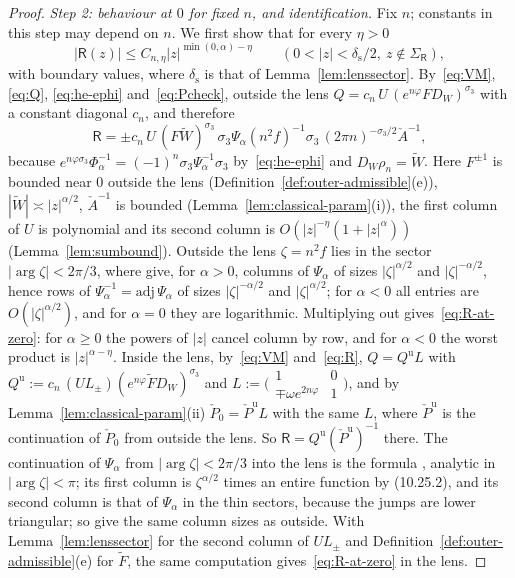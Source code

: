 \begin{proof}
\emph{Step 2: behaviour at $0$ for fixed $n$, and identification.} Fix $n$; constants in this step may depend on $n$.
We first show that for every $\eta>0$
\begin{equation}\label{eq:R-at-zero}
  |\mathsf R(z)|\le C_{n,\eta}|z|^{\min(0,\alpha)-\eta}\qquad(0<|z|<\delta_{\mathrm s}/2,\ z\notin\Sigma_{\mathsf R}),
\end{equation}
with boundary values, where $\delta_{\mathrm s}$ is that of Lemma~\ref{lem:lenssector}. By~\eqref{eq:VM}, \eqref{eq:Q},
\eqref{eq:he-ephi} and~\eqref{eq:Pcheck}, outside the lens
$Q=c_n\,U\,(e^{n\varphi}FD_W)^{\sigma_3}$ with a constant diagonal $c_n$, and therefore
\[
  \mathsf R=\pm c_n\,U\,(F\tilde W)^{\sigma_3}\,\sigma_3\Psi_\alpha(n^2f)^{-1}\sigma_3\,(2\pi n)^{-\sigma_3/2}\check A^{-1},
\]
because $e^{n\varphi\sigma_3}\Phi_\alpha^{-1}=(-1)^n\sigma_3\Psi_\alpha^{-1}\sigma_3$ by~\eqref{eq:he-ephi} and
$D_W\rho_n=\tilde W$. Here $F^{\pm1}$ is bounded near $0$ outside the lens (Definition~\ref{def:outer-admissible}(e)),
$|\tilde W|\asymp|z|^{\alpha/2}$, $\check A^{-1}$ is bounded (Lemma~\ref{lem:classical-param}(i)), the first column of $U$ is
polynomial and its second column is $O(|z|^{-\eta}(1+|z|^\alpha))$ (Lemma~\ref{lem:sumbound}). Outside the lens
$\zeta=n^2f$ lies in the sector $|\arg\zeta|<2\pi/3$, where \cite[(6.19)--(6.21)]{KMVV} give, for $\alpha>0$, columns of
$\Psi_\alpha$ of sizes $|\zeta|^{\alpha/2}$ and $|\zeta|^{-\alpha/2}$, hence rows of $\Psi_\alpha^{-1}=\mathrm{adj}\,\Psi_\alpha$ of
sizes $|\zeta|^{-\alpha/2}$ and $|\zeta|^{\alpha/2}$; for $\alpha<0$ all entries are $O(|\zeta|^{\alpha/2})$, and for $\alpha=0$
they are logarithmic. Multiplying out gives~\eqref{eq:R-at-zero}: for $\alpha\ge0$ the powers of $|z|$ cancel column by
row, and for $\alpha<0$ the worst product is $|z|^{\alpha-\eta}$. Inside the lens, by~\eqref{eq:VM} and~\eqref{eq:R},
$Q=Q^{\mathrm u}L$ with $Q^{\mathrm u}:=c_n\,(UL_\pm)(e^{n\varphi}\tilde FD_W)^{\sigma_3}$ and
$L:=\bigl(\begin{smallmatrix}1&0\\\mp\omega e^{2n\varphi}&1\end{smallmatrix}\bigr)$, and by
Lemma~\ref{lem:classical-param}(ii) $\check P_0=\check P^{\mathrm u}L$ with the same $L$, where $\check P^{\mathrm u}$ is
the continuation of $\check P_0$ from outside the lens. So $\mathsf R=Q^{\mathrm u}(\check P^{\mathrm u})^{-1}$ there.
The continuation of $\Psi_\alpha$ from $|\arg\zeta|<2\pi/3$ into the lens is the formula \cite[(6.23)]{KMVV}, analytic in
$|\arg\zeta|<\pi$; its first column is $\zeta^{\alpha/2}$ times an entire function by (10.25.2), and its second column is
that of $\Psi_\alpha$ in the thin sectors, because the jumps \cite[(6.16), (6.18)]{KMVV} are lower triangular; so
\cite[(6.19)--(6.21)]{KMVV} give the same column sizes as outside. With Lemma~\ref{lem:lenssector} for the second column
of $UL_\pm$ and Definition~\ref{def:outer-admissible}(e) for $\tilde F$, the same computation gives~\eqref{eq:R-at-zero}
in the lens.


\end{proof}
